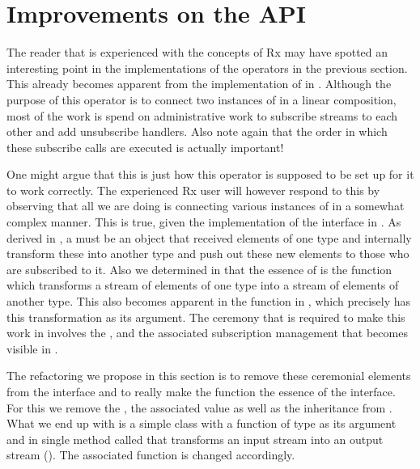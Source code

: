 \section{Improvements on the API}
The reader that is experienced with the concepts of Rx may have spotted an interesting point in the implementations of the operators in the previous section. This already becomes apparent from the implementation of  in . Although the purpose of this operator is to connect two instances of \comp in a linear composition, most of the work is spend on administrative work to subscribe streams to each other and add unsubscribe handlers. Also note again that the order in which these subscribe calls are executed is actually important!

One might argue that this is just how this operator is supposed to be set up for it to work correctly. The experienced Rx user will however respond to this by observing that all we are doing is connecting various instances of \subj in a somewhat complex manner. This is true, given the implementation of the \comp interface in . As derived in , a \comp must be an object that received elements of one type and internally transform these into another type and push out these new elements to those who are subscribed to it. Also we determined in  that the essence of \comp is the  function which transforms a stream of elements of one type into a stream of elements of another type. This also becomes apparent in the  function in , which precisely has this transformation as its argument. The ceremony that is required to make this work in  involves the \subj, \obv and the associated subscription management that becomes visible in .

The refactoring we propose in this section is to remove these ceremonial elements from the \comp interface and to really make the  function the essence of the interface. For this we remove the \subj, the associated  value as well as the inheritance from . What we end up with is a simple class \comp with a  function of type  as its argument and in single method called  that transforms an input stream into an output stream (). The associated  function is changed accordingly.

